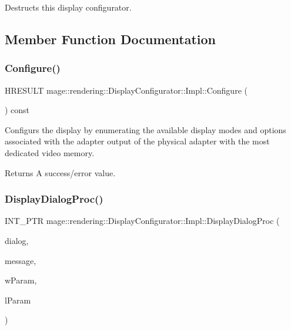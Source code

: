 Destructs this display configurator. 

\subsection{Member Function Documentation}
\mbox{\label{classmage_1_1rendering_1_1_display_configurator_1_1_impl_a9f0f3a2dbe7a8e401fe11735076655ca}} 
\subsubsection{\texorpdfstring{Configure()}{Configure()}}
{\footnotesize\ttfamily H\+R\+E\+S\+U\+LT mage\+::rendering\+::\+Display\+Configurator\+::\+Impl\+::\+Configure (\begin{DoxyParamCaption}{ }\end{DoxyParamCaption}) const}

Configurs the display by enumerating the available display modes and options associated with the adapter output of the physical adapter with the most dedicated video memory.

\begin{DoxyReturn}{Returns}
A success/error value. 
\end{DoxyReturn}
\mbox{\label{classmage_1_1rendering_1_1_display_configurator_1_1_impl_afc4446b37df590031bed6fa1243afb66}} 
\subsubsection{\texorpdfstring{Display\+Dialog\+Proc()}{DisplayDialogProc()}}
{\footnotesize\ttfamily I\+N\+T\+\_\+\+P\+TR mage\+::rendering\+::\+Display\+Configurator\+::\+Impl\+::\+Display\+Dialog\+Proc (\begin{DoxyParamCaption}\item[{H\+W\+ND}]{dialog,  }\item[{U\+I\+NT}]{message,  }\item[{\mbox{[}\mbox{[}maybe\+\_\+unused\mbox{]} \mbox{]} W\+P\+A\+R\+AM}]{w\+Param,  }\item[{\mbox{[}\mbox{[}maybe\+\_\+unused\mbox{]} \mbox{]} L\+P\+A\+R\+AM}]{l\+Param }\end{DoxyParamCaption})\hspace{0.3cm}{\ttfamily [private]}}

